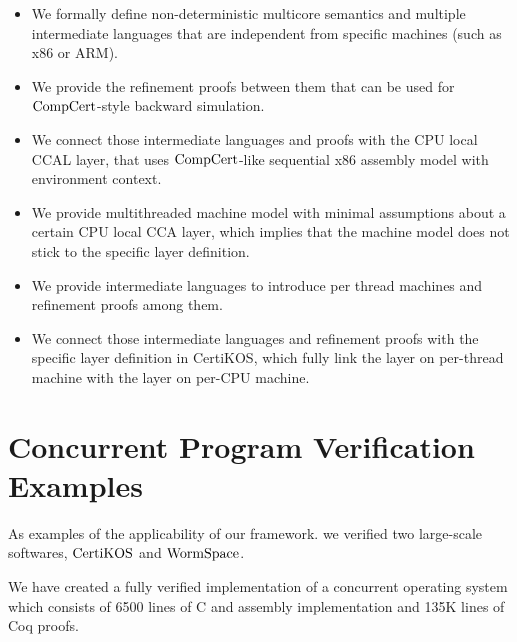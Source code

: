 \begin{itemize}
\item We formally define non-deterministic multicore semantics and multiple intermediate languages that are independent from specific machines (such as x86 or ARM). 
\item We provide the refinement proofs between them that can be used for $\mathrm{CompCert}$-style backward simulation. 
\item We connect those intermediate languages and proofs with the CPU local CCAL layer, that uses $\mathrm{CompCert}$-like sequential x86 assembly model with 
environment context.
\item We provide multithreaded machine model with minimal assumptions about a certain CPU local CCA layer, which implies that the machine model does not stick to the specific layer definition.
\item We provide intermediate languages to introduce per thread machines and refinement proofs among them. 
\item We connect those intermediate languages and refinement proofs with the specific layer definition in CertiKOS, which fully link the layer on per-thread machine with the layer on per-CPU machine.
\end{itemize}
%
%





\section{Concurrent Program Verification Examples}
\label{chapter:introduction:sec:concurrent-program-verification-examples}

As examples of the applicability of our framework. 
we verified two large-scale softwares, $\mathrm{CertiKOS}$ and $\mathrm{WormSpace}$.

We have created a
fully verified implementation of a concurrent operating system
  which consists of 6500 lines of C and
assembly implementation and 135K lines of Coq proofs.

